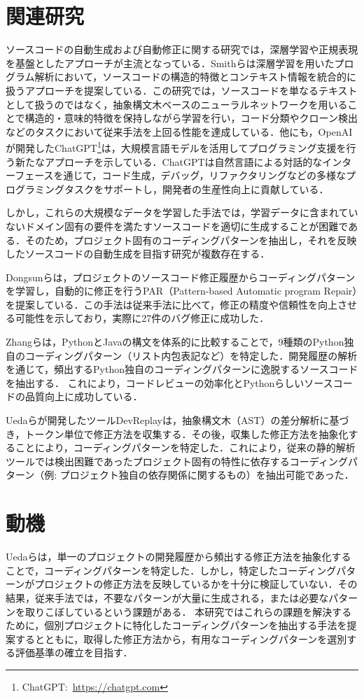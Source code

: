 \documentclass[11pt]{jreport}
\begin{document}
\section{関連研究}
ソースコードの自動生成および自動修正に関する研究では，深層学習や正規表現を基盤としたアプローチが主流となっている．Smithらは深層学習を用いたプログラム解析において，ソースコードの構造的特徴とコンテキスト情報を統合的に扱うアプローチを提案している\cite{smith}．この研究では，ソースコードを単なるテキストとして扱うのではなく，抽象構文木ベースのニューラルネットワークを用いることで構造的・意味的特徴を保持しながら学習を行い，コード分類やクローン検出などのタスクにおいて従来手法を上回る性能を達成している．他にも，OpenAIが開発したChatGPT\footnote{ChatGPT:~\url{https://chatgpt.com}}は，大規模言語モデルを活用してプログラミング支援を行う新たなアプローチを示している．ChatGPTは自然言語による対話的なインターフェースを通じて，コード生成，デバッグ，リファクタリングなどの多様なプログラミングタスクをサポートし，開発者の生産性向上に貢献している．

しかし，これらの大規模なデータを学習した手法では，学習データに含まれていないドメイン固有の要件を満たすソースコードを適切に生成することが困難である．そのため，プロジェクト固有のコーディングパターンを抽出し，それを反映したソースコードの自動生成を目指す研究が複数存在する．

Dongsunらは，プロジェクトのソースコード修正履歴からコーディングパターンを学習し，自動的に修正を行うPAR（Pattern-based Automatic program Repair）を提案している\cite{AutomaticPatch}．この手法は従来手法に比べて，修正の精度や信頼性を向上させる可能性を示しており，実際に27件のバグ修正に成功した．


Zhangらは，PythonとJavaの構文を体系的に比較することで，9種類のPython独自のコーディングパターン（リスト内包表記など）を特定した\cite{idiom}．開発履歴の解析を通じて，頻出するPython独自のコーディングパターンに逸脱するソースコードを抽出する．
これにより，コードレビューの効率化とPythonらしいソースコードの品質向上に成功している．

Uedaらが開発したツールDevReplay\cite{devreplay}は，抽象構文木（AST）の差分解析に基づき，トークン単位で修正方法を収集する．その後，収集した修正方法を抽象化することにより，コーディングパターンを特定した．これにより，従来の静的解析ツールでは検出困難であったプロジェクト固有の特性に依存するコーディングパターン（例: プロジェクト独自の依存関係に関するもの）を抽出可能であった．

\section{動機}
Uedaらは，単一のプロジェクトの開発履歴から頻出する修正方法を抽象化することで，コーディングパターンを特定した．しかし，特定したコーディングパターンがプロジェクトの修正方法を反映しているかを十分に検証していない．その結果，従来手法では，不要なパターンが大量に生成される，または必要なパターンを取りこぼしているという課題がある．
本研究ではこれらの課題を解決するために，個別プロジェクトに特化したコーディングパターンを抽出する手法を提案するとともに，取得した修正方法から，有用なコーディングパターンを選別する評価基準の確立を目指す．
\end{document}
